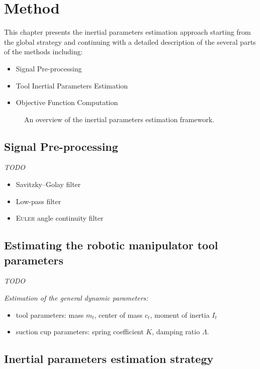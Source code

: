 \documentclass[/home/francois/latex/report/main.tex]{subfiles}
\begin{document}
\chapter{Method}
\label{chapter:method}

This chapter presents the inertial parameters estimation approach starting from the global strategy and continuing with a detailed description of the several parts of the methods including:

\begin{itemize}
  \item Signal Pre-processing
  \item Tool Inertial Parameters Estimation
  \item Objective Function Computation
\end{itemize}

\begin{figure}
\centering
   \caption{An overview of the inertial parameters estimation framework.}
   \label{fig:tikz:model}
\end{figure}

\section{Signal Pre-processing}

\textit{TODO}

{\it
\begin{itemize}
  \item Savitzky–Golay filter
  \item Low-pass filter
  \item \textsc{Euler} angle continuity filter
\end{itemize}
}

\section{Estimating the robotic manipulator tool parameters}

\textit{TODO}

{\it
Estimation of the general dynamic parameters:

\begin{itemize}
  \item tool parameters: mass $m_t$, center of mass $c_t$, moment of inertia $I_t$
  \item suction cup parameters: spring coefficient $K$, damping ratio $\Lambda$.
\end{itemize}
}

\section{Inertial parameters estimation strategy}
\end{document}
